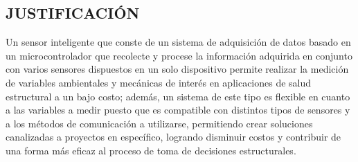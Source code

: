 \documentclass[12pt,letterpaper]{article}
\begin{document}





\newpage


\begin{center}
	\section*{JUSTIFICACIÓN}
\end{center}

\vspace{1cm}


Un sensor inteligente que conste de un sistema de adquisición de datos basado en un microcontrolador que recolecte y procese la información adquirida en conjunto con varios sensores dispuestos en un solo dispositivo permite realizar la medición de variables ambientales y mecánicas de interés en aplicaciones de salud estructural a un bajo costo; además, un sistema de este tipo es flexible en cuanto a las variables a medir puesto que es compatible con distintos tipos de sensores y a los métodos de comunicación a utilizarse, permitiendo crear soluciones canalizadas a proyectos en específico, logrando disminuir costos y contribuir de una forma más eficaz al proceso de toma de decisiones estructurales.
\end{document}
